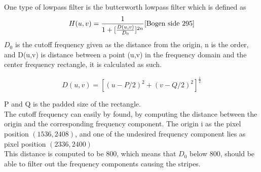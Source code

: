 One type of lowpass filter is the butterworth lowpass filter which is defined as
\begin{equation}
	H(u,v) = \frac{1}{1+[\frac{D(u,v)}{D_0}]^{2n}}
	\label{eq:LBP}
	\cite{Bogen side 295}
\end{equation}
$D_0$ is the cutoff frequency given as the distance from the origin, n  is the order,  and D(u,v) is distance between a point (u,v) in the frequency domain and the center frequency rectangle, it is calculated as such. 

\begin{equation}
D(u,v) = [(u-P/2)^2 + (v-Q/2)^2]^{\frac{1}{2}} 
\end{equation}

P and Q is the padded size of the rectangle. \\


The cutoff frequency can easily by found, by computing the distance between the origin and the corresponding frequency component. The origin i as the pixel position $(1536 ,2408)$, and one of the undesired frequency component lies as pixel position $(2336,2400)$ \\


This distance is computed to be 800, which means that $D_0$ below 800, should be able to filter out the frequency components causing the stripes. \\

